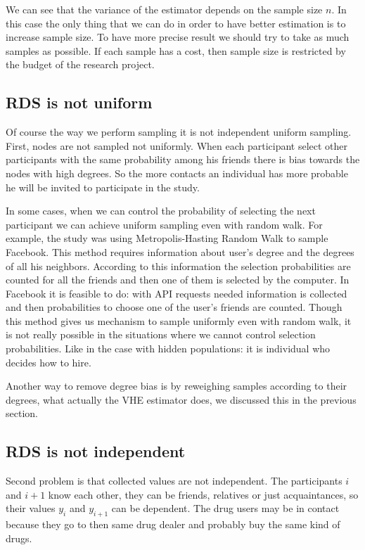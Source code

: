 \documentclass[12pt]{report}
\begin{document}
We can see that the variance of the estimator depends on the sample size $n$. 
In this case the only thing that we can do in order to have better estimation is to increase sample size. To have more precise result we should try to take as much samples as possible. If each sample has a cost, then sample size is restricted by the budget of the research project. 


\subsection{RDS is not uniform}


Of course the way we perform sampling it is not independent uniform sampling. 
First, nodes are not sampled not uniformly. When each participant select other  participants with the same probability among his friends there is bias towards the nodes with high degrees. So the more contacts an individual has more probable he will be invited to participate in the study. 

In some cases, when we can control the probability of selecting the next participant we can achieve uniform sampling even with random walk. For example, the study \cite{gjoka2009walk} was using Metropolis-Hasting Random Walk to sample Facebook. This method requires information about user's degree and the degrees of all his neighbors. According to this information the selection probabilities are counted for all the friends and then one of them is selected by the computer.
In Facebook it is feasible to do: with API requests needed information is collected and then probabilities to choose one of the user's friends are counted. Though this method gives us mechanism to sample uniformly even with random walk, it is not really possible in the situations where we cannot control selection probabilities. Like in the case with hidden populations: it is individual who decides how to hire. 

Another way to remove degree bias is by reweighing samples according to their degrees, what actually the VHE estimator does, we discussed this in the previous section. 

\subsection{RDS is not independent}
Second problem is that collected values are not independent. The participants $i$ and $i+1$ know each other, they can be friends, relatives or just acquaintances, so their values $y_i$ and $y_{i+1}$ can be dependent. The drug users may be in contact because they go to then same drug dealer and probably buy the same kind of drugs. 
\end{document}
